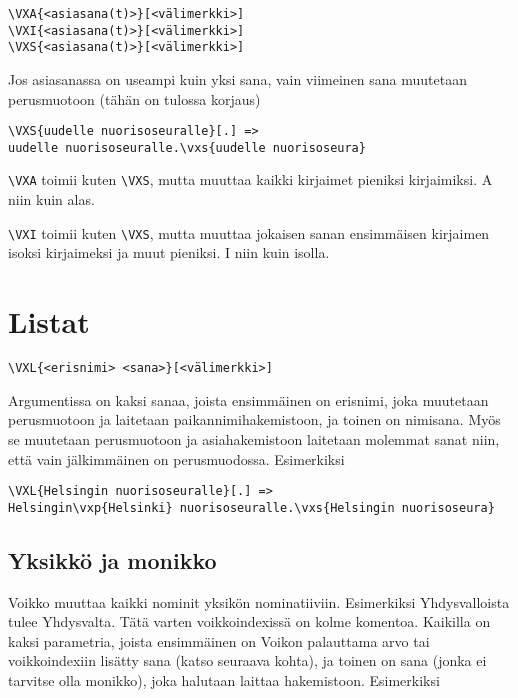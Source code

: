 \documentclass[12pt]{article}
\begin{document}
\begin{verbatim}
\VXA{<asiasana(t)>}[<välimerkki>]
\VXI{<asiasana(t)>}[<välimerkki>]
\VXS{<asiasana(t)>}[<välimerkki>]
\end{verbatim}

Jos asiasanassa on useampi kuin yksi sana, vain viimeinen sana
muutetaan perusmuotoon (tähän on tulossa korjaus)

\begin{verbatim}
\VXS{uudelle nuorisoseuralle}[.] =>
uudelle nuorisoseuralle.\vxs{uudelle nuorisoseura}
\end{verbatim}


\verb=\VXA= toimii kuten \verb=\VXS=, mutta muuttaa kaikki kirjaimet
pieniksi kirjaimiksi. A niin kuin alas.

\verb=\VXI= toimii kuten \verb=\VXS=, mutta muuttaa jokaisen sanan
ensimmäisen kirjaimen isoksi kirjaimeksi ja muut pieniksi.
I niin kuin isolla.


\section*{Listat}


\begin{verbatim}
\VXL{<erisnimi> <sana>}[<välimerkki>]
\end{verbatim}

Argumentissa on kaksi sanaa, joista ensimmäinen on erisnimi, joka
muutetaan perusmuotoon ja laitetaan paikannimihakemistoon, ja toinen
on nimisana. Myös se muutetaan perusmuotoon ja asiahakemistoon
laitetaan molemmat sanat niin, että vain jälkimmäinen on
perusmuodossa. Esimerkiksi

\begin{verbatim}
\VXL{Helsingin nuorisoseuralle}[.] =>
Helsingin\vxp{Helsinki} nuorisoseuralle.\vxs{Helsingin nuorisoseura}
\end{verbatim}


\subsection*{Yksikkö ja monikko}

Voikko muuttaa kaikki nominit yksikön nominatiiviin. Esimerkiksi
Yhdysvalloista tulee Yhdysvalta. Tätä varten voikkoindexissä on kolme
komentoa. Kaikilla on kaksi parametria, joista ensimmäinen on Voikon
palauttama arvo tai voikkoindexiin lisätty sana (katso seuraava
kohta), ja toinen on sana (jonka ei tarvitse olla monikko), joka
halutaan laittaa hakemistoon. Esimerkiksi
\end{document}
